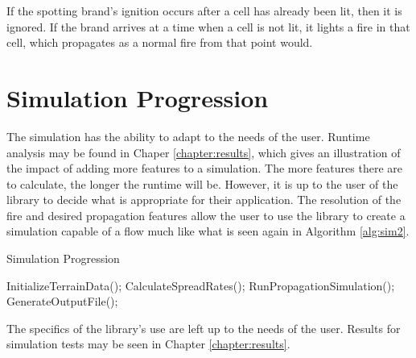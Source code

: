 If the spotting brand's ignition occurs after a cell has already been lit, then it is ignored. If the brand arrives at a time when a cell is not lit, it lights a fire in that cell, which propagates as a normal fire from that point would. 

\section{Simulation Progression}
The simulation has the ability to adapt to the needs of the user. Runtime analysis may be found in Chaper \ref{chapter:results}, which gives an illustration of the impact of adding more features to a simulation. The more features there are to calculate, the longer the runtime will be. However, it is up to the user of the library to decide what is appropriate for their application. The resolution of the fire and desired propagation features allow the user to use the library to create a simulation capable of a flow much like what is seen again in Algorithm \ref{alg:sim2}.

\begin{algorithm}
  \caption{Simulation Progression}
  \label{alg:sim2}
  \begin{algorithmic}
  \STATE InitializeTerrainData();
  \STATE CalculateSpreadRates();
  \STATE RunPropagationSimulation();
  \ENDWHILE  
  \STATE GenerateOutputFile();
  \end{algorithmic}
\end{algorithm}

The specifics of the library's use are left up to the needs of the user. Results for simulation tests may be seen in Chapter \ref{chapter:results}. 